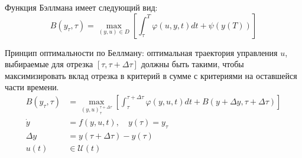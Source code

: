 \documentclass[a4paper,12pt]{article}
\begin{document}
{Функция Бэллмана имеет следующий вид:
\[
    B(y_{\tau}, \tau) = \max_{(y,u) \in D} \left[ \int_{\tau}^{T} \varphi(u, y, t) dt + \psi (y(T)) \right]
\]

Принцип оптимальности по Беллману: оптимальная траектория управления $u$, выбираемые для отрезка $[\tau, \tau + \Delta \tau]$ должны быть такими, чтобы максимизировать вклад отрезка в критерий в сумме с критериями на оставшейся части времени.
\begin{align}
    B(y_{\tau}, \tau) &= \max_{(y,u)^{\tau + \Delta \tau}_{\tau}} \left[ \int_{\tau}^{\tau + \Delta\tau} \varphi(y, u, t) dt + B(y + \Delta y, \tau + \Delta\tau) \right] \label{eq:bellman} \\
    \dot{y} &= f(y, u, t) ,\quad  y(\tau) = y_{\tau} \label{eq:dynamics} \\
    \Delta y &= y(\tau + \Delta\tau) - y(\tau) \label{eq:delta_y} \\
    u(t) &\in \mathcal{U}(t) \label{eq:control_set} 
\end{align}

}
\end{document}
